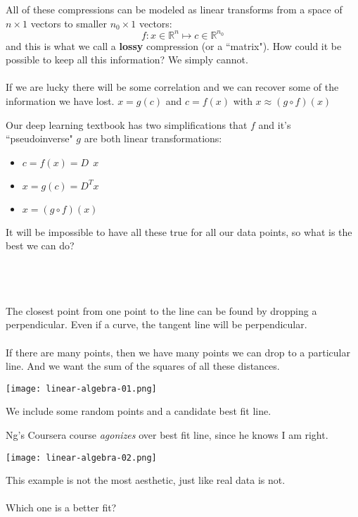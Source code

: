 \documentclass[12pt]{article}
\begin{document}
All of these compressions can be modeled as linear transforms from a space of $n \times 1 $ vectors to smaller $n_0 \times 1$ vectors:
$$ f: x \in \mathbb{R}^n \mapsto c \in \mathbb{R}^{n_0} $$
and this is what we call a \textbf{lossy} compression (or a ``matrix").  How could it be possible to keep all this information?  We simply cannot. \\ \\
If we are lucky there will be some correlation and we can recover some of the information we have lost. $x = g(c) $ and $c = f(x)$ with $x \approx (g \circ f)(x)$ 

\newpage

\noindent Our deep learning textbook has two simplifications that $f$ and it's ``pseudoinverse" $g$ are both linear transformations:
\begin{itemize}
\item $c = f(x) = D\;\,x$
\item $x = g(c) = D^T x$
\item $x = (g \circ f)(x) $
\end{itemize}
It will be impossible to have all these true for all our data points, so what is the best we can do? \\ \\
 \\ \\
The closest point from one point to the line can be found by dropping a perpendicular.  Even if a curve, the tangent line will be perpendicular. \\ \\
If there are many points, then we have many points we can drop to a particular line.  And we want the sum of the squares of all these distances.

\texttt{[image: linear-algebra-01.png]}

\noindent We include some random points and a candidate best fit line.

\newpage

\noindent Ng's Coursera course \textit{agonizes} over best fit line, since he knows I am right.

\texttt{[image: linear-algebra-02.png]}

\noindent This example is not the most aesthetic, just like real data is not. \\ \\
Which one is a better fit? 
\end{document}
